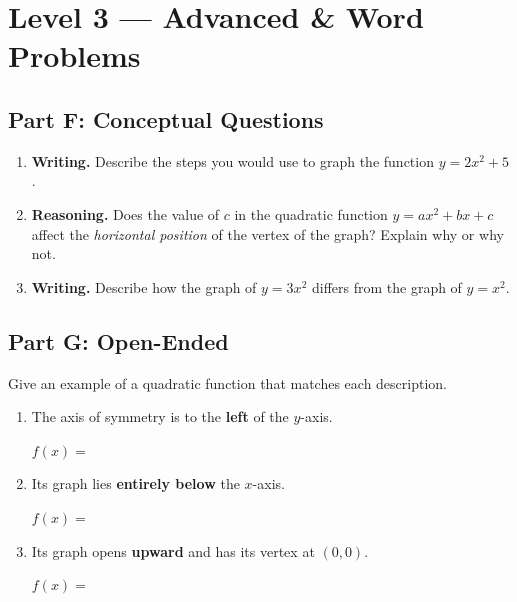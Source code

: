 \documentclass[12pt]{article}
\newcommand{\blank}{\underline{\hspace{2.5cm}}}
\begin{document}
\section*{\textcolor{alertred}{Level 3 — Advanced \& Word Problems}}

\subsection*{Part F: Conceptual Questions}

\begin{enumerate}[leftmargin=*, label=\textbf{\arabic*.}, start=22]

  \item \textbf{Writing.} Describe the steps you would use to graph the function $y = 2x^2 + 5$.
  \vspace{3.5cm}

  \item \textbf{Reasoning.} Does the value of $c$ in the quadratic function $y = ax^2 + bx + c$
        affect the \emph{horizontal position} of the vertex of the graph? Explain why or why not.
  \vspace{3.5cm}

  \item \textbf{Writing.} Describe how the graph of $y = 3x^2$ differs from the graph of $y = x^2$.
  \vspace{3cm}

\end{enumerate}

\subsection*{Part G: Open-Ended}

\noindent Give an example of a quadratic function that matches each description.

\begin{enumerate}[leftmargin=*, label=\textbf{\arabic*.}, start=25]

  \item The axis of symmetry is to the \textbf{left} of the $y$-axis.

  \vspace{1.5cm}
  $f(x) = $ \blank

  \item Its graph lies \textbf{entirely below} the $x$-axis.

  \vspace{1.5cm}
  $f(x) = $ \blank

  \item Its graph opens \textbf{upward} and has its vertex at $(0,0)$.

  \vspace{1.5cm}
  $f(x) = $ \blank

\end{enumerate}
\end{document}
